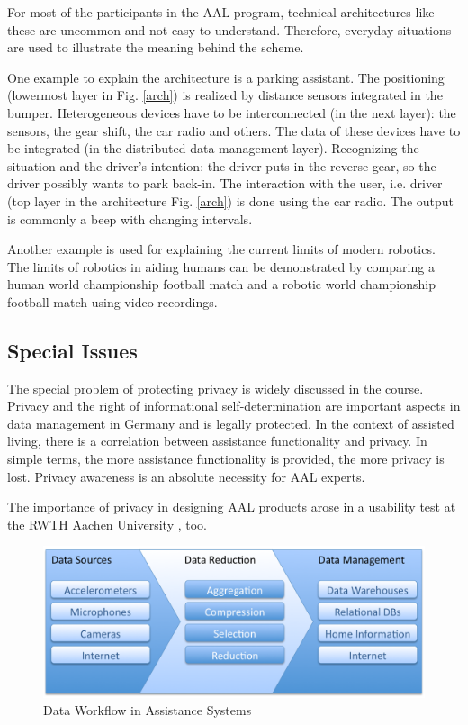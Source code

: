 \documentclass[runningheads,a4paper]{llncs}
\begin{document}
For most of the participants in the AAL program, technical architectures like these are uncommon and not easy to understand. Therefore, everyday situations are used to illustrate the meaning behind the scheme. 

One example to explain the architecture is a parking assistant.
The positioning (lowermost layer in Fig. \ref{arch}) is realized by distance sensors integrated in the bumper.
Heterogeneous devices have to be interconnected (in the next layer): the sensors, the gear shift, the car radio and others.
The data of these devices have to be integrated (in the distributed data management layer). 
Recognizing the situation and the driver's intention: the driver puts in the reverse gear, so the driver possibly wants to park back-in.
The interaction with the user, i.e. driver (top layer in the architecture Fig. \ref{arch}) is done using the car radio. The output is commonly a beep with changing intervals.

Another example is used for explaining the current limits of modern robotics. The limits of robotics in aiding humans can be demonstrated by comparing a human world championship football match and a robotic world championship football match using video recordings.


\subsection{Special Issues}
The special problem of protecting privacy is widely discussed in the course. Privacy and the right of informational self-determination are important aspects in data management in Germany and is legally protected. In the context of assisted living, there is a correlation between assistance functionality and privacy. In simple terms, the more assistance functionality is provided, the more privacy is lost. Privacy awareness is an absolute necessity for AAL experts.

The importance of privacy in designing AAL products arose in a usability test at the RWTH Aachen University \cite{ZiWi14}, too.

\begin{figure}[ht]
    \centering
        \includegraphics[width=1.0\textwidth]{figures/data-workflow.png}
    \caption{Data Workflow in Assistance Systems}
    \label{workflow}
\end{figure}
\end{document}
